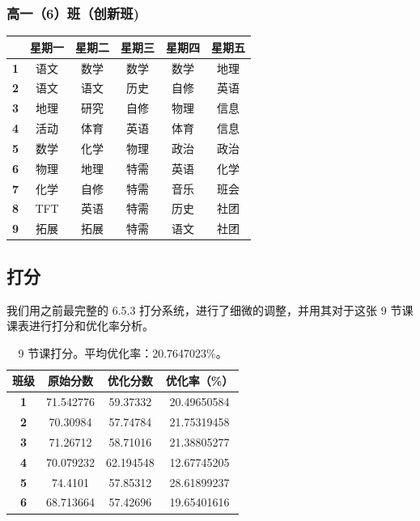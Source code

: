 \documentclass[a4paper]{article}
\begin{document}
  \subsubsection{高一（6）班（创新班)}

   \begin{tabular}{cccccc}
   \toprule
   & \bf 星期一 & \bf 星期二 & \bf 星期三 & \bf 星期四 & \bf 星期五 \\
   \midrule
   \bf 1 & 语文 & 数学 & 数学 & 数学 & 地理 \\
   \bf 2 & 语文 & 语文 & 历史 & 自修 & 英语 \\
   \bf 3 & 地理 & 研究 & 自修 & 物理 & 信息 \\
   \bf 4 & 活动 & 体育 & 英语 & 体育 & 信息 \\
   \bf 5 & 数学 & 化学 & 物理 & 政治 & 政治 \\
   \midrule
   \bf 6 & 物理 & 地理 & 特需 & 英语 & 化学 \\
   \bf 7 & 化学 & 自修 & 特需 & 音乐 & 班会 \\
   \bf 8 & TFT  & 英语 & 特需 & 历史 & 社团 \\
   \bf 9 & 拓展 & 拓展 & 特需 & 语文 & 社团 \\
   \bottomrule
   \end{tabular}

 \clearpage

 \subsection{打分}

  我们用之前最完整的 6.5.3 打分系统，进行了细微的调整，并用其对于这张 9 节课课表进行打分和优化率分析。

  \begin{table}[H]
  \centering
  \begin{tabular}{cccc}
  \toprule
  \bf 班级 & \bf 原始分数 & \bf 优化分数 & \bf 优化率（\%）\\
  \midrule
  \bf 1 & 71.542776 & 59.37332 & 20.49650584 \\
  \bf 2 & 70.30984 & 57.74784 & 21.75319458 \\
  \bf 3 & 71.26712 & 58.71016 & 21.38805277 \\
  \bf 4 & 70.079232 & 62.194548 & 12.67745205 \\
  \bf 5 & 74.4101 & 57.85312 & 28.61899237 \\
  \bf 6 & 68.713664 & 57.42696 & 19.65401616 \\
  \bottomrule
  \end{tabular}
  \caption{9 节课打分。平均优化率：20.7647023\%。}
  \end{table}
\end{document}
